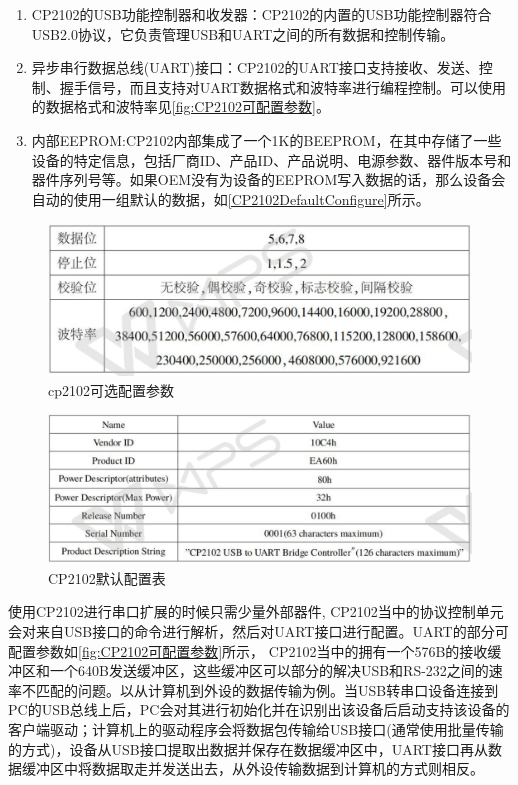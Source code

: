 \begin{enumerate}
\item CP2102的USB功能控制器和收发器：CP2102的内置的USB功能控制器符合USB2.0协议，它负责管理USB和UART之间的所有数据和控制传输。
\item 异步串行数据总线(UART)接口：CP2102的UART接口支持接收、发送、控制、握手信号，而且支持对UART数据格式和波特率进行编程控制。可以使用的数据格式和波特率见\autoref{fig:CP2102可配置参数}。
\item 内部EEPROM:CP2102内部集成了一个1K的BEEPROM，在其中存储了一些设备的特定信息，包括厂商ID、产品ID、产品说明、电源参数、器件版本号和器件序列号等\cite{CP2102}。如果OEM没有为设备的EEPROM写入数据的话，那么设备会自动的使用一组默认的数据，如\autoref{CP2102DefaultConfigure}所示。
\end{enumerate}

\begin{figure}[!h]
\centering
\includegraphics[width=1.0\textwidth]{./graphics/CP2102ChioceConf.pdf}
\caption{cp2102可选配置参数}\label{fig:CP2102可配置参数}
\end{figure}

\begin{figure}[!h]
\centering
\includegraphics[width=1.0\textwidth]{./graphics/CP2102DefConf.pdf}
\caption{CP2102默认配置表}\label{CP2102DefaultConfigure}
\end{figure}
	使用CP2102进行串口扩展的时候只需少量外部器件,
	CP2102当中的协议控制单元会对来自USB接口的命令进行解析，然后对UART接口进行配置。UART的部分可配置参数如\autoref{fig:CP2102可配置参数}所示，
	CP2102当中的拥有一个576B的接收缓冲区和一个640B发送缓冲区，这些缓冲区可以部分的解决USB和RS-232之间的速率不匹配的问题。以从计算机到外设的数据传输为例。当USB转串口设备连接到PC的USB总线上后，PC会对其进行初始化并在识别出该设备后启动支持该设备的客户端驱动；计算机上的驱动程序会将数据包传输给USB接口(通常使用批量传输的方式)，设备从USB接口提取出数据并保存在数据缓冲区中，UART接口再从数据缓冲区中将数据取走并发送出去，从外设传输数据到计算机的方式则相反\cite{李雪红2004USB}。	
	

